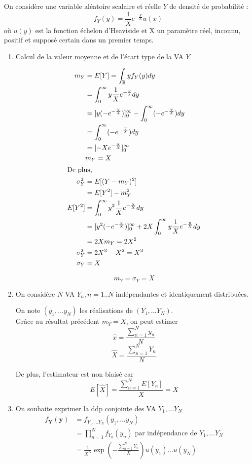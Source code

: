 \documentclass[main.tex]{subfiles}
\begin{document}
On considère une variable aléatoire scalaire et réelle $Y$ de densité de probabilité :
\[ f_Y(y) = \frac{1}{X}e^{-\frac{y}{X}}u(x) \]
où $u(y)$ est la fonction échelon d'Heaviside et X un paramètre réel, inconnu, positif et supposé certain dans un premier temps.

\begin{enumerate}
\item Calcul de la valeur moyenne et de l'écart type de la VA $Y$
\begin{multicols}{2}
\begin{align*}
m_Y & = E[Y] = \int_{\mathbb{R}} y f_Y(y) dy \\
& = \int_0^{\infty} y \frac{1}{X} e^{-\frac{y}{x}} dy \\
& = [y(-e^{-\frac{y}{X}})]_0^{\infty} - \int_0^{\infty} (-e^{-\frac{y}{X}}) dy \\
& = \int_0^{\infty} (-e^{-\frac{y}{X}}) dy \\
& = [-Xe^{-\frac{y}{X}}]_0^{\infty} \\
& m_Y = X \\
\intertext{De plus,}
\sigma_Y^2 & = E[(Y-m_Y)^2] \\
& = E[Y^2] - m_Y^2 \\
E[Y^2] & = \int_0^{\infty} y^2\frac{1}{X}e^{-\frac{y}{X}}dy \\
& = [y^2(-e^{-\frac{y}{X}})]_0^{\infty} + 2X\int_0^{\infty}y\frac{1}{X}e^{-\frac{y}{X}}dy \\
& = 2Xm_Y = 2X^2\\
\sigma_Y^2 & = 2X^2 - X^2 = X^2 \\
\sigma_Y & = X
\end{align*}
\end{multicols}
\[ \boxed{m_Y = \sigma_Y = X} \]

\item On considère $N$ VA $Y_n, n=1..N$ indépendantes et identiquement distribuées.

On note $(y_1,...y_N)$ les réalisations de $(Y_1,...Y_N)$.\\

Grâce au résultat précédent $m_Y = X$, on peut estimer 
\[ \hat{x} = \frac{\sum_{n=1}^Ny_n}{N} \]
\[ \hat{X} = \frac{\sum_{n=1}^NY_n}{N} \]

De plus, l'estimateur est non biaisé car 
\[ E[\hat{X}] = \frac{\sum_{n=1}^N E[Y_n]}{X} = X \]

\item On souhaite exprimer la ddp conjointe des VA $Y_1,...Y_N$
\begin{align*}
f_\mathbf{Y}(\mathbf{y}) & = f_{Y_1, ... Y_N}(y_1,...y_N) \\
& = \prod_ {n=1}^N f_{Y_n}(y_n) \text{ par indépendance de } Y_1,...Y_N \\
& = \frac{1}{X^N} \exp(-\frac{\sum_ {n=1}^N Y_n}{X}) u(y_1)...u(y_N)
\end{align*}


\end{enumerate}
\end{document}
